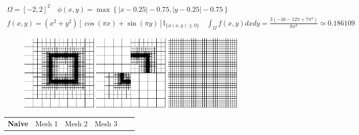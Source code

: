 \documentclass[8pt]{beamer}
\begin{document}
\begin{frame}\begin{footnotesize}
\begin{gather*}
 \Omega = [-2,2]^2 \quad \phi(x,y) = \max{ \left  \{ |x-0.25|-0.75, |y-0.25|-0.75 \right \} } \\
 f(x,y) = (x^2+y^2) \left[ \cos{(\pi x)} + \sin{(\pi y) }\right ]\mathbb{I}_{ \{ \phi(x,y) \leq 0 \}} \quad \int_{\Omega} f(x,y) dx dy = \frac{3(-16 - 12 \pi + 7 \pi^2)}{8 \pi^3} \simeq 0.186109
\end{gather*}\end{footnotesize}
 \begin{figure}[!h]
\begin{center}
\includegraphics[width=0.32\textwidth]{./figures/integrator/square_1.pdf}
\includegraphics[width=0.32\textwidth]{./figures/integrator/square_2.pdf}
\includegraphics[width=0.32\textwidth]{./figures/integrator/square_3.pdf}
\end{center}
\end{figure}
\begin{footnotesize}
\begin{center}
\begin{tabular}{|c|c|c|c|c|c|c|c|c|} 
   \hline
    \textbf{Naive} & \multicolumn{2}{|c|}{Mesh 1} & \multicolumn{2}{|c|}{Mesh 2} & \multicolumn{2}{|c|}{Mesh 3}\\

\end{tabular}
\end{center}
\end{footnotesize}
\end{frame}
\end{document}
